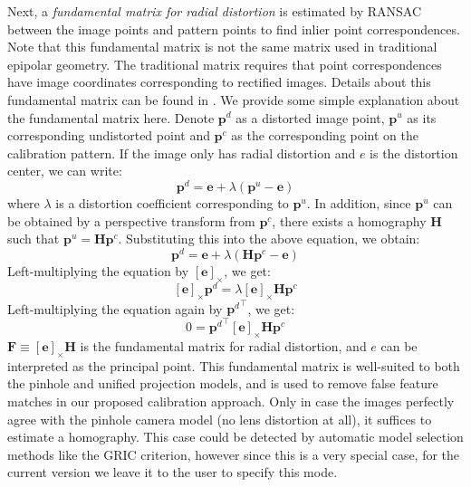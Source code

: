 \documentclass{report}
\begin{document}
Next, a \textit{fundamental matrix for radial distortion} is estimated by RANSAC between the image points and pattern points to find inlier point correspondences. Note that this fundamental matrix is not the same matrix used in traditional epipolar geometry. The traditional matrix requires that point correspondences have image coordinates corresponding to rectified images. Details about this fundamental matrix can be found in \cite{hartley2007parameter}. We provide some simple explanation about the fundamental matrix here. Denote $\mathbf{p}^d$ as a distorted image point, $\mathbf{p}^u$ as its corresponding undistorted point and $\mathbf{p}^c$ as the corresponding point on the calibration pattern. If the image only has radial distortion and $e$ is the distortion center, we can write:
\begin{equation}
\mathbf{p}^d = \mathbf{e} + \lambda (\mathbf{p}^u - \mathbf{e})
\end{equation}
where $\lambda$ is a distortion coefficient corresponding to $\mathbf{p}^u$. In addition, since $\mathbf{p}^u$ can be obtained by a perspective transform from $\mathbf{p}^c$, there exists a homography $\mathbf{H}$ such that $\mathbf{p}^u = \mathbf{H} \mathbf{p}^c$. Substituting this into the above equation, we obtain: 
\begin{equation}
\mathbf{p}^d = \mathbf{e} + \lambda (\mathbf{H} \mathbf{p}^c - \mathbf{e})
\end{equation}
Left-multiplying the equation by $[\mathbf{e}]_\times$, we get:
\begin{equation}
{}[\mathbf{e}]_\times \mathbf{p}^d = \lambda [\mathbf{e}]_\times \mathbf{H} \mathbf{p}^c
\end{equation}
Left-multiplying the equation again by ${\mathbf{p}^d}^\top$, we get:
\begin{equation}
0 = {\mathbf{p}^d}^\top [\mathbf{e}]_\times \mathbf{H} \mathbf{p}^c
\end{equation}
$\mathbf{F} \equiv [\mathbf{e}]_\times \mathbf{H}$ is the fundamental matrix for radial distortion, and $e$ can be interpreted as the principal point. This fundamental matrix is well-suited to both the pinhole and unified projection models, and is used to remove false feature matches in our proposed calibration approach. Only in case the images perfectly agree with the pinhole camera model (no lens distortion at all), it suffices to estimate a homography.
This case could be detected by automatic model selection methods like the GRIC criterion\cite{torr1997assessment}, however since this is a very special case, for the current version we leave it to the user to specify this mode.
\end{document}

